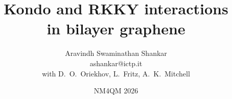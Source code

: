\title[Kondo \& RKKY in bilayer graphene]{Kondo and RKKY interactions\\in bilayer graphene}
\author[A. S. Shankar]{Aravindh Swaminathan Shankar \\[2pt] {\footnotesize ashankar@ictp.it}\\[4pt]
{\scriptsize with D.~O.~Oriekhov, L.~Fritz, A.~K.~Mitchell}}
\date[NM4QM 2026]{NM4QM 2026}


\newcommand{\ft}[1]{\vspace*{0.25cm}\textbf{#1}\smallskip\par\noindent{\color{mygray}\rule[1.0ex]{\linewidth}{0.5pt}}\vspace*{-0.35cm}}
\newcommand{\tk}[1]{\par\vfill\noindent\colorbox{LightGray}{\parbox{\dimexpr\linewidth-2\fboxsep}{\centering\small #1}}\vspace*{-0.2cm}}
\newcommand{\lnn}[1]{\ln #1}


